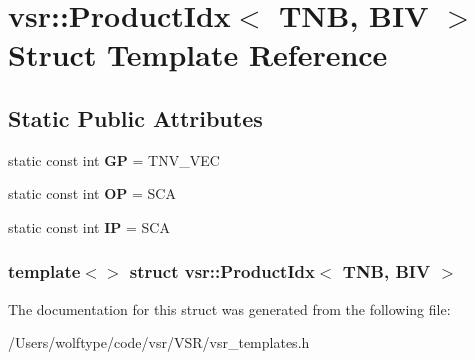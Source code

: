 \hypertarget{structvsr_1_1_product_idx_3_01_t_n_b_00_01_b_i_v_01_4}{\section{vsr\-:\-:Product\-Idx$<$ T\-N\-B, B\-I\-V $>$ Struct Template Reference}
\label{structvsr_1_1_product_idx_3_01_t_n_b_00_01_b_i_v_01_4}
}
\subsection*{Static Public Attributes}
\begin{DoxyCompactItemize}
\item 
\hypertarget{structvsr_1_1_product_idx_3_01_t_n_b_00_01_b_i_v_01_4_a512bcdca996a5bb7434dd2dd6d257182}{static const int {\bfseries G\-P} = T\-N\-V\-\_\-\-V\-E\-C}\label{structvsr_1_1_product_idx_3_01_t_n_b_00_01_b_i_v_01_4_a512bcdca996a5bb7434dd2dd6d257182}

\item 
\hypertarget{structvsr_1_1_product_idx_3_01_t_n_b_00_01_b_i_v_01_4_aa8dd25bd50a6994271fe073c245d097d}{static const int {\bfseries O\-P} = S\-C\-A}\label{structvsr_1_1_product_idx_3_01_t_n_b_00_01_b_i_v_01_4_aa8dd25bd50a6994271fe073c245d097d}

\item 
\hypertarget{structvsr_1_1_product_idx_3_01_t_n_b_00_01_b_i_v_01_4_a2c8894d314b40f97d603b3dda230523e}{static const int {\bfseries I\-P} = S\-C\-A}\label{structvsr_1_1_product_idx_3_01_t_n_b_00_01_b_i_v_01_4_a2c8894d314b40f97d603b3dda230523e}

\end{DoxyCompactItemize}
\subsubsection*{template$<$$>$ struct vsr\-::\-Product\-Idx$<$ T\-N\-B, B\-I\-V $>$}



The documentation for this struct was generated from the following file\-:\begin{DoxyCompactItemize}
\item 
/\-Users/wolftype/code/vsr/\-V\-S\-R/vsr\-\_\-templates.\-h\end{DoxyCompactItemize}
